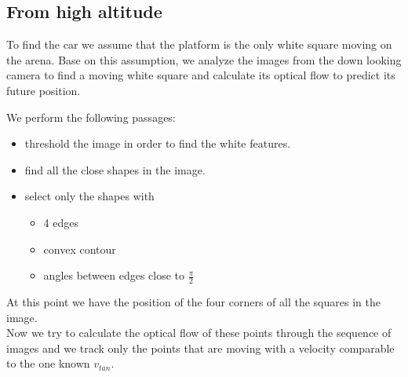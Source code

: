 \subsection{From high altitude}
To find the car we assume that the platform is the only white square moving on the arena.
Base on this assumption, we analyze the images from the down looking camera to find a moving white square and calculate its optical flow to predict its future position.

We perform the following passages:
\begin{itemize}
\item threshold the image in order to find the white features.
\item find all the close shapes in the image.
\item select only the shapes with
\begin{itemize}
\item 4 edges
\item convex contour
\item angles between edges close to $\frac{\pi}{2}$
\end{itemize}
\end{itemize}
At this point we have the position of the four corners of all the squares in the image.\\
Now we try to calculate the optical flow of these points through the sequence of images and we track only the points that are moving with a velocity comparable to the one known $v_{tan}$.\\

